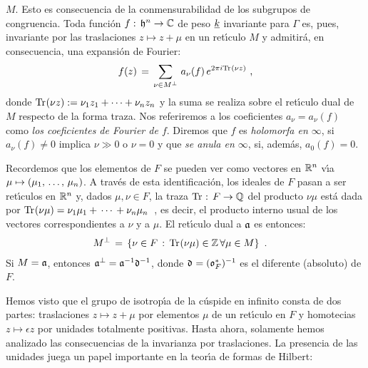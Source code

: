 $M$. Esto es consecuencia de la conmensurabilidad de los subgrupos de
congruencia. Toda funci\'{o}n $f:\,\hP^{n}\rightarrow\bb{C}$ de peso $\peso{k}$
invariante para $\Gamma$ es, pues, invariante por las traslaciones
$z\mapsto z+\mu$ en un ret\'{\i}culo $M$ y admitir\'{a}, en consecuencia, una
expansi\'{o}n de Fourier:
\begin{equation}
	\label{eq:expansiondefourier}
	f(z) \,=\,\sum_{\nu\in M^{\perp}}\,a_{\nu}(f)\,e^{2\pi i\traza(\nu z)}
	\text{ ,}
\end{equation}
%
donde $\traza(\nu z):=\nu_{1}z_{1}+\cdots+\nu_{n}z_{n}$ y la suma se realiza
sobre el ret\'{\i}culo dual de $M$ respecto de la forma traza.
Nos referiremos a los coeficientes $a_{\nu}= a_{\nu}(f)$ como \emph{los %
coeficientes de Fourier de $f$}.
Diremos que $f$ es \emph{holomorfa en $\infty$}, si $a_{\nu}(f)\not =0$ implica
$\nu\gg 0$ o $\nu=0$ y que \emph{se anula en $\infty$}, si, adem\'{a}s,
$a_{0}(f)=0$.

\begin{obsReticuloDual}
	Recordemos que los elementos de $F$ se pueden ver como vectores en
	$\bb{R}^{n}$ v\'{\i}a $\mu\mapsto(\lista{\mu}{n})$. A trav\'{e}s de
	esta identificaci\'{o}n, los ideales de $F$ pasan a ser ret\'{\i}culos
	en $\bb{R}^{n}$ y, dados $\mu,\nu\in F$, la traza
	$\traza:\,F\rightarrow\bb{Q}$ del producto $\nu\mu$ est\'{a} dada por
	\begin{math}
		\traza(\nu\mu)=\nu_{1}\mu_{1}+\,\cdots\,+\nu_{n}\mu_{n}
	\end{math}~,
	es decir, el producto interno usual de los vectores correspondientes a
	$\nu$ y a $\mu$. El ret\'{\i}culo dual a $\frak{a}$ es entonces:
	\begin{align*}
		M^{\perp} & \,=\,
			\left\lbrace \nu\in F\,:\,\traza(\nu\mu)\in\bb{Z}\,
			\forall\mu\in M\right\rbrace
		\text{ .}
	\end{align*}
	Si $M=\frak{a}$, entonces
	$\frak{a}^{\perp}=\frak{a}^{-1}\diferente^{-1}$, donde
	$\diferente=(\oka{F}^{*})^{-1}$ es el diferente (absoluto) de $F$.
\end{obsReticuloDual}

Hemos visto que el grupo de isotrop\'{\i}a de la c\'{u}spide en infinito consta
de dos partes: traslaciones $z\mapsto z+\mu$ por elementos $\mu$ de un
ret\'{\i}culo en $F$ y homotecias $z\mapsto \epsilon z$ por unidades totalmente
positivas. Hasta ahora, solamente hemos analizado las consecuencias de la
invarianza por traslaciones. La presencia de las unidades juega un papel
importante en la teor\'{\i}a de formas de Hilbert:

